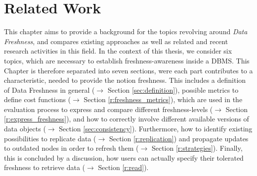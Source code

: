 \chapter{Related Work}
\label{c:related}



This chapter aims to provide a background for the topics revolving around \emph{Data Freshness}, and compares existing approaches 
as well as related and recent research activities in this field. 
In the context of this thesis, we consider six topics, which are necessary to establish 
freshness-awareness inside a DBMS.
This Chapter is therefore separated into seven sections, were each part contributes to a characteristic, needed to 
provide the notion freshness. This includes a definition of Data Freshness in general ($\rightarrow$ Section \ref{sec:definition}), 
possible metrics to define cost functions ($\rightarrow$ Section \ref{r:freshness_metrics}), which are used
in the evaluation process to express and compare different freshness-levels ($\rightarrow$ Section \ref{r:express_freshness}), and
how to correctly involve different available versions of data objects ($\rightarrow$ Section \ref{sec:consistency}). 
Furthermore, how to identify existing possibilities to replicate data ($\rightarrow$ Section \ref{r:replication}) 
and propagate updates to outdated nodes in order to refresh them ($\rightarrow$ Section \ref{r:strategies}).
Finally, this is concluded by a discussion, how users can actually specify their tolerated freshness to retrieve data ($\rightarrow$ Section \ref{r:read}).







